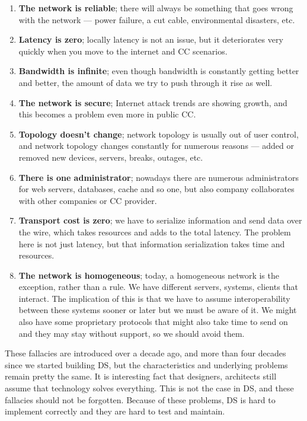 \begin{enumerate}[start=1,label={(\bfseries \arabic*)}]\label{ds:8_fallacies}
	\item \textbf{The network is reliable}; there will always be something that goes wrong with the network --- power failure, a cut cable, environmental disasters, etc.
	\item \textbf{Latency is zero}; locally latency is not an issue, but it deteriorates very quickly when you move to the internet and CC scenarios.
	\item \textbf{Bandwidth is infinite}; even though bandwidth is constantly getting better and better, the amount of data we try to push through it rise as well.
	\item \textbf{The network is secure};  Internet attack trends are showing growth, and this becomes a problem even more in public CC.
	\item \textbf{Topology doesn't change}; network topology is usually out of user control, and network topology changes constantly for numerous reasons --- added or removed new devices, servers, breaks, outages, etc.
	\item \textbf{There is one administrator}; nowadays there are numerous administrators for web servers, databases, cache and so one, but also company collaborates with other companies or CC provider.
	\item \textbf{Transport cost is zero}; we have to serialize information and send data over the wire, which takes resources and adds to the total latency. The problem here is not just latency, but that information serialization takes time and resources.
	\item \textbf{The network is homogeneous}; today, a homogeneous network is the exception, rather than a rule. We have different servers, systems, clients that interact. The implication of this is that we have to assume interoperability between these systems sooner or later but we must be aware of it. We might also have some proprietary protocols that might also take time to send on and they may stay without support, so we should avoid them.
\end{enumerate}

These fallacies are introduced over a decade ago, and more than four decades since we started building DS, but the characteristics and underlying problems remain pretty the same. It is interesting fact that designers, architects still assume that technology solves everything. This is not the case in DS, and these fallacies should not be forgotten. Because of these problems, DS is hard to implement correctly and they are hard to test and maintain.
%
%
